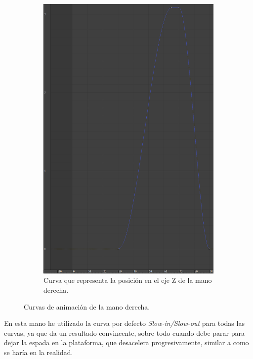 \begin{figure}[H]
\begin{subfigure}[t]{0.32\textwidth}
       \includegraphics[width=\textwidth]{imagenes/manos/derecha/posZ.png}
       \caption{Curva que representa la posición en el eje Z de la mano derecha.}
    \end{subfigure}
    \caption{Curvas de animación de la mano derecha.}
\end{figure}


En esta mano he utilizado la curva por defecto \textit{Slow-in/Slow-out} para todas las curvas, ya que da un resultado convincente, sobre todo cuando debe parar para dejar la espada en la plataforma, que desacelera progresivamente, similar a como se haría en la realidad.

